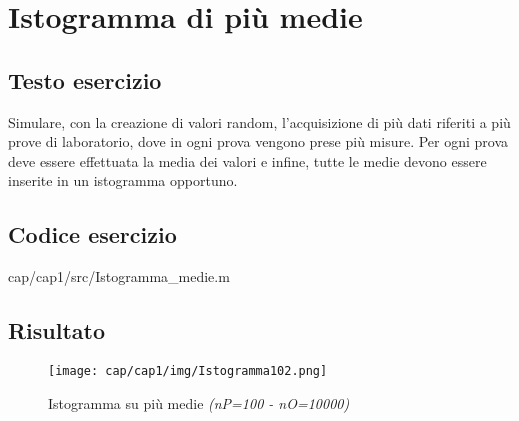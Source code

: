 \section{Istogramma di più medie}

\subsection{Testo esercizio}
Simulare, con la creazione di valori random, l'acquisizione di più dati riferiti a più 
prove di laboratorio, dove in ogni prova vengono prese più misure. Per ogni prova deve 
essere effettuata la media dei valori e infine, tutte le medie devono essere inserite in 
un istogramma opportuno.

\subsection{Codice esercizio}

{cap/cap1/src/Istogramma_medie.m}
\subsection{Risultato}
\begin{figure}[h]
    \centering
    \texttt{[image: cap/cap1/img/Istogramma102.png]}
    \caption{Istogramma su più medie \textit{(nP=100 - nO=10000)}}
    \label{fig:istogramma103}
\end{figure}